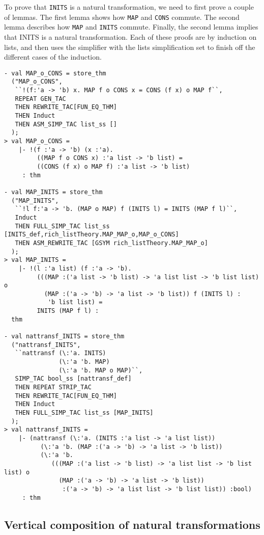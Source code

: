 To prove that  \texttt{INITS} is a natural transformation,
we need to first prove a couple of lemmas. The first lemma
shows how \texttt{MAP} and \texttt{CONS} commute.  The second
lemma describes how \texttt{MAP} and \texttt{INITS} commute. Finally,
the second lemma implies that INITS is a natural transformation. Each
of these proofs are by induction on lists, and then uses the simplifier
with the lists simplification set 
to finish off the different cases of the induction.

\begin{session}
\begin{verbatim}
- val MAP_o_CONS = store_thm
  ("MAP_o_CONS",
   ``!(f:'a -> 'b) x. MAP f o CONS x = CONS (f x) o MAP f``,
   REPEAT GEN_TAC
   THEN REWRITE_TAC[FUN_EQ_THM]
   THEN Induct
   THEN ASM_SIMP_TAC list_ss []
  );
> val MAP_o_CONS =
    |- !(f :'a -> 'b) (x :'a).
         ((MAP f o CONS x) :'a list -> 'b list) =
         ((CONS (f x) o MAP f) :'a list -> 'b list)
     : thm

- val MAP_INITS = store_thm
  ("MAP_INITS",
   ``!l f:'a -> 'b. (MAP o MAP) f (INITS l) = INITS (MAP f l)``,
   Induct
   THEN FULL_SIMP_TAC list_ss [INITS_def,rich_listTheory.MAP_MAP_o,MAP_o_CONS]
   THEN ASM_REWRITE_TAC [GSYM rich_listTheory.MAP_MAP_o]
  );
> val MAP_INITS =
    |- !(l :'a list) (f :'a -> 'b).
         (((MAP :('a list -> 'b list) -> 'a list list -> 'b list list) o
           (MAP :('a -> 'b) -> 'a list -> 'b list)) f (INITS l) :
            'b list list) =
         INITS (MAP f l) :
  thm

- val nattransf_INITS = store_thm
  ("nattransf_INITS",
   ``nattransf (\:'a. INITS)
               (\:'a 'b. MAP)
               (\:'a 'b. MAP o MAP)``,
   SIMP_TAC bool_ss [nattransf_def]
   THEN REPEAT STRIP_TAC
   THEN REWRITE_TAC[FUN_EQ_THM]
   THEN Induct
   THEN FULL_SIMP_TAC list_ss [MAP_INITS]
  );
> val nattransf_INITS =
    |- (nattransf (\:'a. (INITS :'a list -> 'a list list))
          (\:'a 'b. (MAP :('a -> 'b) -> 'a list -> 'b list))
          (\:'a 'b.
             (((MAP :('a list -> 'b list) -> 'a list list -> 'b list list) o
               (MAP :('a -> 'b) -> 'a list -> 'b list))
                :('a -> 'b) -> 'a list list -> 'b list list)) :bool)
     : thm
\end{verbatim}
\end{session}


\subsection{Vertical composition of natural transformations}

